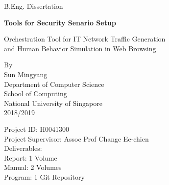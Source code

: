 \documentclass[12pt]{report}
\begin{document}
\begin{titlepage}
	\begin{center}

		B.Eng. Dissertation
		\vspace{0.5cm}

		{\LARGE \textbf{Tools for Security Senario Setup}}

		Orchestration Tool for IT Network Traffic Generation\\
		and Human Behavior Simulation in Web Browsing

		\vspace{2cm}

		By\\
		Sun Mingyang\\
		\vspace{1cm}
		Department of Computer Science\\
		School of Computing\\
		National University of Singapore\\
		2018/2019\\
	\end{center}
	
	\vfill

	\begin{flushleft}
		Project ID: H0041300\\
		Project Supervisor: Assoc Prof Change Ee-chien\\
		\vspace{0.5cm}
		Deliverables:\\
		\setlength{\parindent}{30pt}
		Report: 1 Volume\\
		Manual: 2 Volumes\\
		Program: 1 Git Repository\\
	\end{flushleft}

\end{titlepage}
\end{document}
